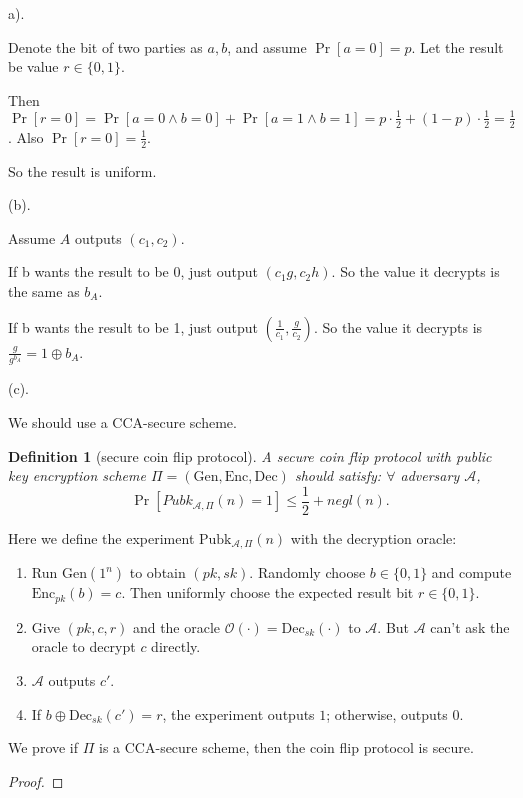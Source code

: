 \documentclass[a4paper]{article}
\newtheorem{definition}{Definition}
\newcommand{\Enc}{\text{Enc}}
\newcommand{\Dec}{\text{Dec}}
\newcommand{\Gen}{\text{Gen}}
\newcommand{\Pubk}{\text{Pubk}}
\newcommand{\A}{\mathcal{A}}
\newcommand{\OO}{\mathcal{O}}
\newenvironment{problem}[2][Problem]{\begin{trivlist}
\item[\hskip \labelsep {\bfseries #1}\hskip \labelsep {\bfseries #2.}]}{\end{trivlist}}
\begin{document}
\begin{problem}{11.8}
(a).\par
Denote the bit of two parties as $a,b$, and assume $\Pr[a=0]=p$. Let the result be value $r\in\{0,1\}$.\par
Then $\Pr[r=0]=\Pr[a=0\land b=0]+\Pr[a=1\land b=1]=p\cdot\frac12+(1-p)\cdot\frac12=\frac12$. Also $\Pr[r=0]=\frac12$.\par
So the result is uniform.\par\vspace{2ex}
(b).\par
Assume $A$ outputs $(c_1,c_2)$.\par
If b wants the result to be 0, just output $(c_1g,c_2h)$. So the value it decrypts is the same as $b_A$.\par
If b wants the result to be 1, just output $(\frac{1}{c_1},\frac{g}{c_2})$. So the value it decrypts is $\frac{g}{g^{b_A}}=1\oplus b_A$.\par
\vspace{2ex}
(c).\par 
We should use a CCA-secure scheme.\par
\begin{definition}[secure coin flip protocol]
A secure coin flip protocol with public key encryption scheme $\Pi=(\Gen,\Enc,\Dec)$ should satisfy: $\forall$ adversary $\A$, 
$$\Pr[Pubk_{\A,\Pi}(n)=1]\le \frac12+negl(n).$$
\end{definition}\par\vspace{1ex}
Here we define the experiment $\Pubk_{\A,\Pi}(n)$ with the decryption oracle:
\begin{enumerate}
    \item Run $\Gen(1^n)$ to obtain $(pk,sk)$. Randomly choose $b\in \{0,1\}$ and compute $\Enc_{pk}(b)=c$. 
    Then uniformly choose the expected result bit $r\in \{0,1\}$.
    \item Give $(pk,c,r)$ and the oracle $\OO(\cdot)=\Dec_{sk}(\cdot)$ to $\A$. But $\A$ can't ask the oracle to decrypt $c$ directly. 
    \item $\A$ outputs $c'$. 
    \item If $b\oplus\Dec_{sk}(c')=r$, the experiment outputs $1$; otherwise, outputs $0$.
\end{enumerate}\par
We prove if $\Pi$ is a CCA-secure scheme, then the coin flip protocol is secure.\par
\begin{proof}

\end{proof}
\end{problem}
\end{document}

